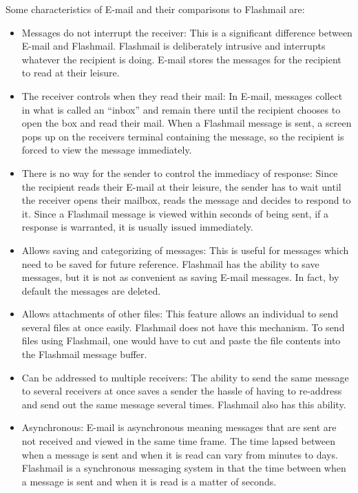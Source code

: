 Some characteristics of E-mail and their comparisons to Flashmail are:
\begin{itemize}
\item Messages do not interrupt the receiver: This is a significant
  difference between E-mail and Flashmail.  Flashmail is deliberately
  intrusive and interrupts whatever the recipient is doing.  E-mail stores
  the messages for the recipient to read at their leisure.

\item The receiver controls when they read their mail: In E-mail, messages
  collect in what is called an ``inbox'' and remain there until the
  recipient chooses to open the box and read their mail.  When a Flashmail
  message is sent, a screen pops up on the receivers terminal containing
  the message, so the recipient is forced to view the message immediately.

\item There is no way for the sender to control the immediacy of response:
  Since the recipient reads their E-mail at their leisure, the sender has
  to wait until the receiver opens their mailbox, reads the message and
  decides to respond to it.  Since a Flashmail message is viewed within
  seconds of being sent, if a response is warranted, it is usually issued
  immediately.

\item Allows saving and categorizing of messages: This is useful for
  messages which need to be saved for future reference.  Flashmail has the
  ability to save messages, but it is not as convenient as saving E-mail
  messages. In fact, by default the messages are deleted.
  
\item Allows attachments of other files: This feature allows an individual
  to send several files at once easily.  Flashmail does not have this
  mechanism.  To send files using Flashmail, one would have to cut and
  paste the file contents into the Flashmail message buffer.

\item Can be addressed to multiple receivers: The ability to send the same
  message to several receivers at once saves a sender the hassle of having
  to re-address and send out the same message several times.  Flashmail
  also has this ability.

\item Asynchronous: E-mail is asynchronous meaning messages that are sent
  are not received and viewed in the same time frame.  The time lapsed
  between when a message is sent and when it is read can vary from minutes
  to days.  Flashmail is a synchronous messaging system in that the time
  between when a message is sent and when it is read is a matter of
  seconds.

\end{itemize}

